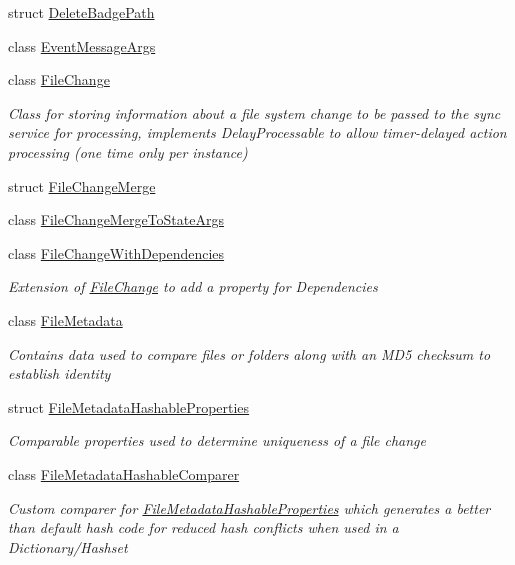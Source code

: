 \begin{DoxyCompactItemize}
struct \hyperlink{struct_cloud_api_public_1_1_model_1_1_delete_badge_path}{Delete\-Badge\-Path}
\item 
class \hyperlink{class_cloud_api_public_1_1_model_1_1_event_message_args}{Event\-Message\-Args}
\item 
class \hyperlink{class_cloud_api_public_1_1_model_1_1_file_change}{File\-Change}
\begin{DoxyCompactList}\small\item\em Class for storing information about a file system change to be passed to the sync service for processing, implements Delay\-Processable to allow timer-\/delayed action processing (one time only per instance) \end{DoxyCompactList}\item 
struct \hyperlink{struct_cloud_api_public_1_1_model_1_1_file_change_merge}{File\-Change\-Merge}
\item 
class \hyperlink{class_cloud_api_public_1_1_model_1_1_file_change_merge_to_state_args}{File\-Change\-Merge\-To\-State\-Args}
\item 
class \hyperlink{class_cloud_api_public_1_1_model_1_1_file_change_with_dependencies}{File\-Change\-With\-Dependencies}
\begin{DoxyCompactList}\small\item\em Extension of \hyperlink{class_cloud_api_public_1_1_model_1_1_file_change}{File\-Change} to add a property for Dependencies \end{DoxyCompactList}\item 
class \hyperlink{class_cloud_api_public_1_1_model_1_1_file_metadata}{File\-Metadata}
\begin{DoxyCompactList}\small\item\em Contains data used to compare files or folders along with an M\-D5 checksum to establish identity \end{DoxyCompactList}\item 
struct \hyperlink{struct_cloud_api_public_1_1_model_1_1_file_metadata_hashable_properties}{File\-Metadata\-Hashable\-Properties}
\begin{DoxyCompactList}\small\item\em Comparable properties used to determine uniqueness of a file change \end{DoxyCompactList}\item 
class \hyperlink{class_cloud_api_public_1_1_model_1_1_file_metadata_hashable_comparer}{File\-Metadata\-Hashable\-Comparer}
\begin{DoxyCompactList}\small\item\em Custom comparer for \hyperlink{struct_cloud_api_public_1_1_model_1_1_file_metadata_hashable_properties}{File\-Metadata\-Hashable\-Properties} which generates a better than default hash code for reduced hash conflicts when used in a Dictionary/\-Hashset \end{DoxyCompactList}\item 

\end{DoxyCompactItemize}
